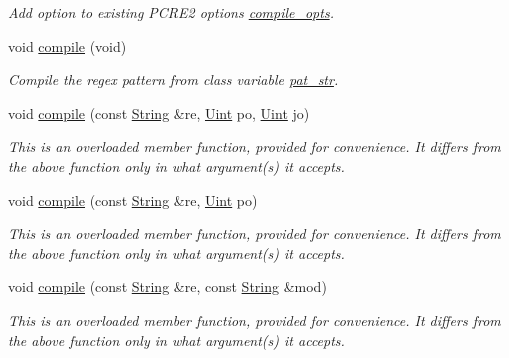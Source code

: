 \begin{DoxyCompactItemize}
\begin{DoxyCompactList}\small\item\em Add option to existing P\+C\+R\+E2 options \hyperlink{classjpcre2_1_1Regex_a5954131e9085de63229ed5c11417df69}{compile\+\_\+opts}. \end{DoxyCompactList}\item 
void \hyperlink{classjpcre2_1_1Regex_aad1d5ef1e87f762f68a587eec4022e69}{compile} (void)
\begin{DoxyCompactList}\small\item\em Compile the regex pattern from class variable \hyperlink{classjpcre2_1_1Regex_a0bceb85b6dbba355b56b5cc312214435}{pat\+\_\+str}. \end{DoxyCompactList}\item 
void \hyperlink{classjpcre2_1_1Regex_a4640915bc907aa3b80da543f1eb7e74f}{compile} (const \hyperlink{namespacejpcre2_a91f03070152fb228bc116c5a737f1d16}{String} \&re, \hyperlink{namespacejpcre2_a078242d38221a13fb3543b9edd78c099}{Uint} po, \hyperlink{namespacejpcre2_a078242d38221a13fb3543b9edd78c099}{Uint} jo)
\begin{DoxyCompactList}\small\item\em This is an overloaded member function, provided for convenience. It differs from the above function only in what argument(s) it accepts. \end{DoxyCompactList}\item 
void \hyperlink{classjpcre2_1_1Regex_a01394dcb222c4d442cabbffb4bcf570a}{compile} (const \hyperlink{namespacejpcre2_a91f03070152fb228bc116c5a737f1d16}{String} \&re, \hyperlink{namespacejpcre2_a078242d38221a13fb3543b9edd78c099}{Uint} po)
\begin{DoxyCompactList}\small\item\em This is an overloaded member function, provided for convenience. It differs from the above function only in what argument(s) it accepts. \end{DoxyCompactList}\item 
void \hyperlink{classjpcre2_1_1Regex_acd49e856009160c622e90b81b6557d8d}{compile} (const \hyperlink{namespacejpcre2_a91f03070152fb228bc116c5a737f1d16}{String} \&re, const \hyperlink{namespacejpcre2_a91f03070152fb228bc116c5a737f1d16}{String} \&mod)
\begin{DoxyCompactList}\small\item\em This is an overloaded member function, provided for convenience. It differs from the above function only in what argument(s) it accepts. \end{DoxyCompactList}\item 

\end{DoxyCompactItemize}
